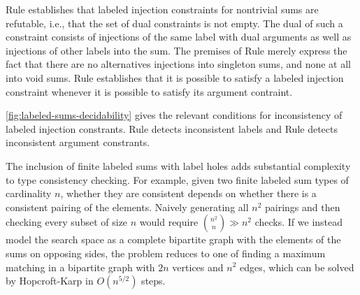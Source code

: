 
Rule \RXInj establishes that labeled injection constraints for nontrivial sums are refutable, i.e., that the set of dual constraints is not empty.
The dual of such a constraint consists of injections of the same label with dual arguments as well as injections of other labels into the sum.
The premises of Rule \RXInj merely express the fact that there are no alternatives injections into singleton sums, and none at all into void sums.
Rule \PInj establishes that it is possible to satisfy a labeled injection constraint whenever it is possible to satisfy its argument contraint.


\autoref{fig:labeled-sums-decidability} gives the relevant conditions for inconsistency of labeled injection constrants.
Rule \CINCInjTag detects inconsistent labels and
Rule \CINCInjArg detects inconsistent argument constrants.

The inclusion of finite labeled sums with label holes adds substantial complexity to type consistency checking.
For example, given two finite labeled sum types of cardinality $n$,
whether they are consistent depends on whether there is a consistent pairing of the elements.
Naively generating all $n^2$ pairings and then checking every subset of size $n$ 
would require $\binom{n^2}{n} \gg n^2$ checks.
If we instead model the search space as a complete bipartite graph with the elements of the sums on opposing sides,
the problem reduces to one of finding a maximum matching in a bipartite graph with $2n$ vertices and $n^2$ edges,
which can be solved by Hopcroft-Karp in $O(n^{5/2})$ steps.
